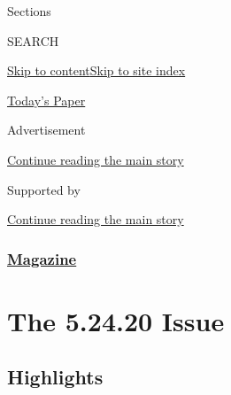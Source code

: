 Sections

SEARCH

\protect\hyperlink{site-content}{Skip to
content}\protect\hyperlink{site-index}{Skip to site index}

\href{https://myaccount.nytimes3xbfgragh.onion/auth/login?response_type=cookie\&client_id=vi}{}

\href{https://www.nytimes3xbfgragh.onion/section/todayspaper}{Today's
Paper}

Advertisement

\protect\hyperlink{after-top}{Continue reading the main story}

Supported by

\protect\hyperlink{after-sponsor}{Continue reading the main story}

\hypertarget{magazine}{%
\subsubsection{\texorpdfstring{\href{/section/magazine}{Magazine}}{Magazine}}\label{magazine}}

\hypertarget{the-52420-issue}{%
\section{The 5.24.20 Issue}\label{the-52420-issue}}

\hypertarget{highlights}{%
\subsection{Highlights}\label{highlights}}

